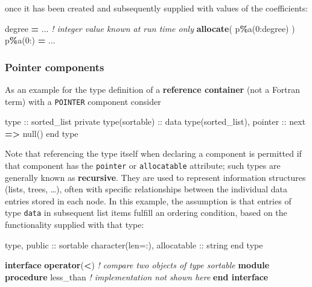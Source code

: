 \documentclass[
  paper=a4,
  ,captions=tableheading
]{scrartcl}
\newenvironment{Shaded}{\begin{snugshade}}{\end{snugshade}}
\newcommand{\CommentTok}[1]{\textcolor[rgb]{0.56,0.35,0.01}{\textit{#1}}}
\newcommand{\DataTypeTok}[1]{\textcolor[rgb]{0.13,0.29,0.53}{#1}}
\newcommand{\DecValTok}[1]{\textcolor[rgb]{0.00,0.00,0.81}{#1}}
\newcommand{\KeywordTok}[1]{\textcolor[rgb]{0.13,0.29,0.53}{\textbf{#1}}}
\newcommand{\NormalTok}[1]{#1}
\newcommand{\OperatorTok}[1]{\textcolor[rgb]{0.81,0.36,0.00}{\textbf{#1}}}
\begin{document}
once it has been created and subsequently supplied with values of the
coefficients:

\begin{Shaded}
\begin{Highlighting}[]
\NormalTok{degree }\KeywordTok{=}\NormalTok{ ... }\CommentTok{! integer value known at run time only}
\KeywordTok{allocate}\NormalTok{( p}\OperatorTok{\%}\NormalTok{a(}\DecValTok{0}\NormalTok{:degree) )}
\NormalTok{p}\OperatorTok{\%}\NormalTok{a(}\DecValTok{0}\NormalTok{:) }\KeywordTok{=}\NormalTok{ ...}
\end{Highlighting}
\end{Shaded}

\subsubsection{Pointer components}\label{pointer-components}

As an example for the type definition of a \textbf{reference container}
(not a Fortran term) with a \texttt{POINTER} component consider

\begin{Shaded}
\begin{Highlighting}[]
\DataTypeTok{type} \DataTypeTok{::}\NormalTok{ sorted\_list}
  \DataTypeTok{private}
  \DataTypeTok{type(sortable)} \DataTypeTok{::}\NormalTok{ data}
  \DataTypeTok{type(sorted\_list)}\NormalTok{, }\DataTypeTok{pointer} \DataTypeTok{::}\NormalTok{ next }\KeywordTok{=}\OperatorTok{\textgreater{}}\NormalTok{ null()}
\DataTypeTok{end type}
\end{Highlighting}
\end{Shaded}

Note that referencing the type itself when declaring a component is
permitted if that component has the \texttt{pointer} or
\texttt{allocatable} attribute; such types are generally known as
\textbf{recursive}. They are used to represent information structures
(lists, trees, \ldots), often with specific relationships between the
individual data entries stored in each node. In this example, the
assumption is that entries of type \texttt{data} in subsequent list
items fulfill an ordering condition, based on the functionality supplied
with that type:

\begin{Shaded}
\begin{Highlighting}[]
\DataTypeTok{type}\NormalTok{, }\DataTypeTok{public} \DataTypeTok{::}\NormalTok{ sortable}
  \DataTypeTok{character(len=:)}\NormalTok{, }\DataTypeTok{allocatable} \DataTypeTok{::}\NormalTok{ string}
\DataTypeTok{end type}

\KeywordTok{interface} \KeywordTok{operator}\NormalTok{(}\OperatorTok{\textless{}}\NormalTok{)         }\CommentTok{! compare two objects of type sortable}
  \KeywordTok{module procedure}\NormalTok{ less\_than  }\CommentTok{! implementation not shown here}
\KeywordTok{end interface}
\end{Highlighting}
\end{Shaded}
\end{document}
